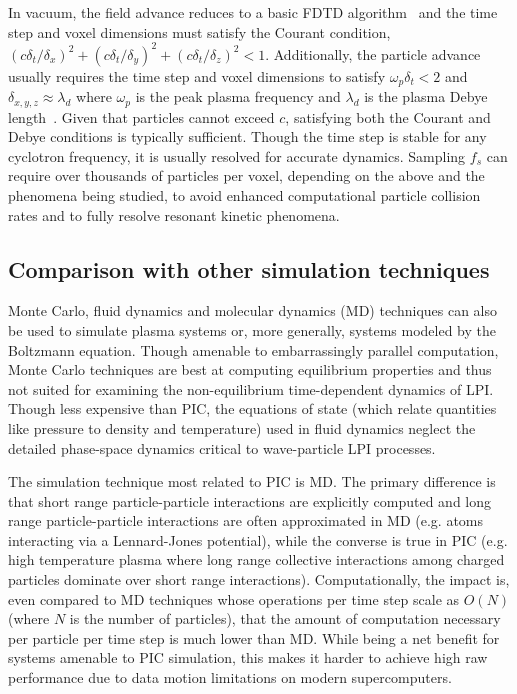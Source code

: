\documentclass[journal,twoside]{IEEEtran}
\begin{document}
In vacuum, the field advance reduces to a basic FDTD
algorithm~\cite{Yee_1966} and the time step and voxel dimensions must
satisfy the Courant condition, $\left(c\delta_t/\delta_x\right)^2 +
\left(c\delta_t/\delta_y\right)^2 + \left(c\delta_t/\delta_z\right)^2
< 1$.  Additionally, the particle advance usually requires the time
step and voxel dimensions to satisfy $\omega_p \delta_t < 2$ and
$\delta_{x,y,z} \approx \lambda_d$ where $\omega_p$ is the peak plasma
frequency and $\lambda_d$ is the plasma Debye
length~\cite{Birdsall_Langdon_1985,Hockney_Eastwood_1988}.  Given that
particles cannot exceed $c$, satisfying both the Courant and Debye
conditions is typically sufficient.  Though the time step is stable
for any cyclotron frequency, it is usually resolved for accurate
dynamics.  Sampling $f_s$ can require over thousands of particles per
voxel, depending on the above and the phenomena being studied, to avoid
enhanced computational particle collision rates and to fully resolve
resonant kinetic phenomena.

\subsection{Comparison with other simulation techniques}

Monte Carlo, fluid dynamics and molecular dynamics (MD) techniques can
also be used to simulate plasma systems or, more generally, systems
modeled by the Boltzmann equation.  Though amenable to embarrassingly
parallel computation, Monte Carlo techniques are best at computing
equilibrium properties and thus not suited for examining the
non-equilibrium time-dependent dynamics of LPI.  Though less expensive
than PIC, the equations of state (which relate quantities like
pressure to density and temperature) used in fluid dynamics neglect
the detailed phase-space dynamics critical to wave-particle LPI
processes.

The simulation technique most related to PIC is MD.  The primary
difference is that short range particle-particle interactions are
explicitly computed and long range particle-particle interactions are
often approximated in MD (e.g. atoms interacting via a Lennard-Jones
potential), while the converse is true in PIC (e.g. high temperature
plasma where long range collective interactions among charged
particles dominate over short range interactions).  Computationally,
the impact is, even compared to MD techniques whose operations per
time step scale as $O(N)$ (where $N$ is the number of particles), that
the amount of computation necessary per particle per time step is much
lower than MD.  While being a net benefit for systems amenable to PIC
simulation, this makes it harder to achieve high raw performance due
to data motion limitations on modern supercomputers.
\end{document}
